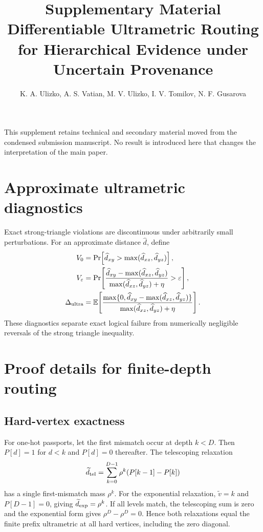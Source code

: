 \documentclass[11pt]{article}
\title{Supplementary Material\\Differentiable Ultrametric Routing for Hierarchical Evidence under Uncertain Provenance}
\author{K. A. Ulizko, A. S. Vatian, M. V. Ulizko, I. V. Tomilov, N. F. Gusarova}
\date{}
\begin{document}
\maketitle

This supplement retains technical and secondary material moved from the condensed submission manuscript. No result is introduced here that changes the interpretation of the main paper.

\section{Approximate ultrametric diagnostics}
Exact strong-triangle violations are discontinuous under arbitrarily small perturbations. For an approximate distance $\widehat d$, define
\begin{align}
V_0 &= \Pr\!\left[\widehat d_{xy}>\max(\widehat d_{xz},\widehat d_{yz})\right],\\
V_\varepsilon &= \Pr\!\left[
\frac{\widehat d_{xy}-\max(\widehat d_{xz},\widehat d_{yz})}
{\max(\widehat d_{xz},\widehat d_{yz})+\eta}>\varepsilon\right],\\
\Delta_{\rm ultra} &= \mathbb E\!\left[
\frac{\max\{0,\widehat d_{xy}-\max(\widehat d_{xz},\widehat d_{yz})\}}
{\max(\widehat d_{xz},\widehat d_{yz})+\eta}\right].
\end{align}
These diagnostics separate exact logical failure from numerically negligible reversals of the strong triangle inequality.

\section{Proof details for finite-depth routing}
\subsection{Hard-vertex exactness}
For one-hot passports, let the first mismatch occur at depth $k<D$. Then $P[d]=1$ for $d<k$ and $P[d]=0$ thereafter. The telescoping relaxation
\[
\widetilde d_{\rm tel}=\sum_{k=0}^{D-1}\rho^k(P[k-1]-P[k])
\]
has a single first-mismatch mass $\rho^k$. For the exponential relaxation, $\widetilde v=k$ and $P[D-1]=0$, giving $\widetilde d_{\rm exp}=\rho^k$. If all levels match, the telescoping sum is zero and the exponential form gives $\rho^D-\rho^D=0$. Hence both relaxations equal the finite prefix ultrametric at all hard vertices, including the zero diagonal.
\end{document}

